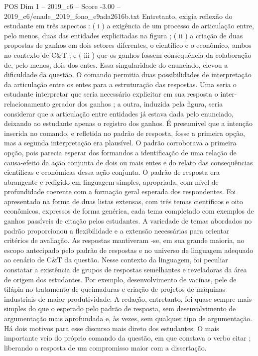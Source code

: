 \begin{textsample}{POS Dim 1 – 2019\_c6 – Score -3.00 – 2019\_c6/enade\_2019\_fono\_e9ada2616b.txt}
Entretanto, exigia reflexão do estudante em três aspectos : ( i ) a exigência de um processo de articulação entre, pelo menos, duas das entidades explicitadas na figura ; ( ii ) a criação de duas propostas de ganhos em dois setores diferentes, o científico e o econômico, ambos no contexto de C\&T ; e ( iii ) que os ganhos fossem consequência da colaboração de, pelo menos, dois dos entes.
Essa singularidade do enunciado, elevou a dificuldade da questão.
O comando permitia duas possibilidades de interpretação da articulação entre os entes para a estruturação das respostas.
Uma seria o estudante interpretar que seria necessário explicitar em sua resposta o inter-relacionamento gerador dos ganhos ; a outra, induzida pela figura, seria considerar que a articulação entre entidades já estava dada pelo enunciado, deixando ao estudante apenas o registro dos ganhos.
É presumível que a intenção inserida no comando, e refletida no padrão de resposta, fosse a primeira opção, mas a segunda interpretação era plausível.
O padrão corroborava a primeira opção, pois parecia esperar dos formandos a identificação de uma relação de causa-efeito da ação conjunta de dois ou mais entes e do relato das consequências científicas e econômicas dessa ação conjunta.
O padrão de resposta era abrangente e redigido em linguagem simples, apropriada, com nível de profundidade coerente com a formação geral esperada dos respondentes.
Foi apresentado na forma de duas listas extensas, com três temas científicos e oito econômicos, expressos de forma genérica, cada tema completado com exemplos de ganhos passíveis de citação pelos estudantes.
A variedade de temas abordados no padrão proporcionou a flexibilidade e a extensão necessárias para orientar critérios de avaliação.
As respostas mantiveram -se, em sua grande maioria, no escopo antecipado pelo padrão de respostas e no universo de linguagem adequado ao cenário de C\&T da questão.
Nesse contexto da linguagem, foi peculiar constatar a existência de grupos de respostas semelhantes e reveladoras da área de origem dos estudantes.
Por exemplo, desenvolvimento de vacinas, pele de tilápia no tratamento de queimaduras e criação de projetos de máquinas industriais de maior produtividade.
A redação, entretanto, foi quase sempre mais simples do que o esperado pelo padrão de resposta, sem desenvolvimento de argumentação mais aprofundada e, às vezes, sem qualquer tipo de argumentação.
Há dois motivos para esse discurso mais direto dos estudantes.
O mais importante veio do próprio comando da questão, em que constava o verbo citar ; liberando a resposta de um compromisso maior com a dissertação.

\end{textsample}
